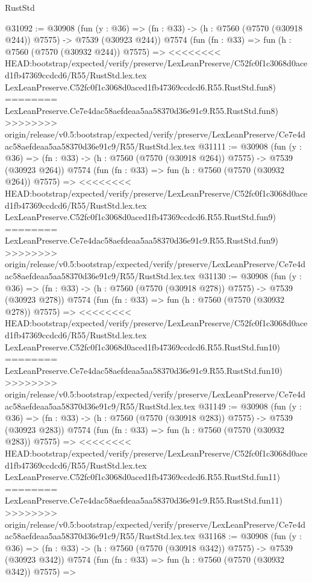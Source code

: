 \begin{lexlean}{RustStd}
\begin{coremodule}
{\begin{coremodule}
{{{{{{{{{{{{{{{{{{{{{{{{{{{{{{{{{{{{{{{{{{{@31092 := @30908
    (fun (y : @36) => (fn : @33) -> (h : @7560 (@7570 (@30918 @244)) @7575) -> @7539 (@30923 @244))
    @7574
    (fun (fn : @33) =>
    fun (h : @7560 (@7570 (@30932 @244)) @7575) =>
<<<<<<<< HEAD:bootstrap/expected/verify/preserve/LexLeanPreserve/C52fc0f1c3068d0aced1fb47369ccdcd6/R55/RustStd.lex.tex
    LexLeanPreserve.C52fc0f1c3068d0aced1fb47369ccdcd6.R55.RustStd.fun8)
========
    LexLeanPreserve.Ce7e4dac58aefdeaa5aa58370d36e91c9.R55.RustStd.fun8)
>>>>>>>> origin/release/v0.5:bootstrap/expected/verify/preserve/LexLeanPreserve/Ce7e4dac58aefdeaa5aa58370d36e91c9/R55/RustStd.lex.tex
@31111 := @30908
    (fun (y : @36) => (fn : @33) -> (h : @7560 (@7570 (@30918 @264)) @7575) -> @7539 (@30923 @264))
    @7574
    (fun (fn : @33) =>
    fun (h : @7560 (@7570 (@30932 @264)) @7575) =>
<<<<<<<< HEAD:bootstrap/expected/verify/preserve/LexLeanPreserve/C52fc0f1c3068d0aced1fb47369ccdcd6/R55/RustStd.lex.tex
    LexLeanPreserve.C52fc0f1c3068d0aced1fb47369ccdcd6.R55.RustStd.fun9)
========
    LexLeanPreserve.Ce7e4dac58aefdeaa5aa58370d36e91c9.R55.RustStd.fun9)
>>>>>>>> origin/release/v0.5:bootstrap/expected/verify/preserve/LexLeanPreserve/Ce7e4dac58aefdeaa5aa58370d36e91c9/R55/RustStd.lex.tex
@31130 := @30908
    (fun (y : @36) => (fn : @33) -> (h : @7560 (@7570 (@30918 @278)) @7575) -> @7539 (@30923 @278))
    @7574
    (fun (fn : @33) =>
    fun (h : @7560 (@7570 (@30932 @278)) @7575) =>
<<<<<<<< HEAD:bootstrap/expected/verify/preserve/LexLeanPreserve/C52fc0f1c3068d0aced1fb47369ccdcd6/R55/RustStd.lex.tex
    LexLeanPreserve.C52fc0f1c3068d0aced1fb47369ccdcd6.R55.RustStd.fun10)
========
    LexLeanPreserve.Ce7e4dac58aefdeaa5aa58370d36e91c9.R55.RustStd.fun10)
>>>>>>>> origin/release/v0.5:bootstrap/expected/verify/preserve/LexLeanPreserve/Ce7e4dac58aefdeaa5aa58370d36e91c9/R55/RustStd.lex.tex
@31149 := @30908
    (fun (y : @36) => (fn : @33) -> (h : @7560 (@7570 (@30918 @283)) @7575) -> @7539 (@30923 @283))
    @7574
    (fun (fn : @33) =>
    fun (h : @7560 (@7570 (@30932 @283)) @7575) =>
<<<<<<<< HEAD:bootstrap/expected/verify/preserve/LexLeanPreserve/C52fc0f1c3068d0aced1fb47369ccdcd6/R55/RustStd.lex.tex
    LexLeanPreserve.C52fc0f1c3068d0aced1fb47369ccdcd6.R55.RustStd.fun11)
========
    LexLeanPreserve.Ce7e4dac58aefdeaa5aa58370d36e91c9.R55.RustStd.fun11)
>>>>>>>> origin/release/v0.5:bootstrap/expected/verify/preserve/LexLeanPreserve/Ce7e4dac58aefdeaa5aa58370d36e91c9/R55/RustStd.lex.tex
@31168 := @30908
    (fun (y : @36) => (fn : @33) -> (h : @7560 (@7570 (@30918 @342)) @7575) -> @7539 (@30923 @342))
    @7574
    (fun (fn : @33) =>
    fun (h : @7560 (@7570 (@30932 @342)) @7575) =>
}}}}}}}}}}}}}}}}}}}}}}}}}}}}}}}}}}}}}}}}}}}
\end{coremodule}}
\end{coremodule}
\end{lexlean}
